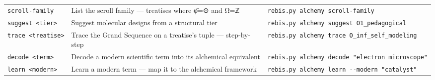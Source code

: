 \begin{longtable}[]{@{}lll@{}}
\begin{minipage}[t]{0.32\columnwidth}
\texttt{scroll-family}\strut
\end{minipage} & \begin{minipage}[t]{0.35\columnwidth}\raggedright
List the scroll family --- treatises where φ̂=⊙ and Ω=ℤ\strut
\end{minipage} & \begin{minipage}[t]{0.24\columnwidth}\raggedright
\texttt{rebis.py\ alchemy\ scroll-family}\strut
\end{minipage}\tabularnewline
\begin{minipage}[t]{0.32\columnwidth}\raggedright
\texttt{suggest\ \textless{}tier\textgreater{}}\strut
\end{minipage} & \begin{minipage}[t]{0.35\columnwidth}\raggedright
Suggest molecular designs from a structural tier\strut
\end{minipage} & \begin{minipage}[t]{0.24\columnwidth}\raggedright
\texttt{rebis.py\ alchemy\ suggest\ O1\_pedagogical}\strut
\end{minipage}\tabularnewline
\begin{minipage}[t]{0.32\columnwidth}\raggedright
\texttt{trace\ \textless{}treatise\textgreater{}}\strut
\end{minipage} & \begin{minipage}[t]{0.35\columnwidth}\raggedright
Trace the Grand Sequence on a treatise's tuple --- step-by-step\strut
\end{minipage} & \begin{minipage}[t]{0.24\columnwidth}\raggedright
\texttt{rebis.py\ alchemy\ trace\ O\_inf\_self\_modeling}\strut
\end{minipage}\tabularnewline
\begin{minipage}[t]{0.32\columnwidth}\raggedright
\texttt{decode\ \textless{}term\textgreater{}}\strut
\end{minipage} & \begin{minipage}[t]{0.35\columnwidth}\raggedright
Decode a modern scientific term into its alchemical equivalent\strut
\end{minipage} & \begin{minipage}[t]{0.24\columnwidth}\raggedright
\texttt{rebis.py\ alchemy\ decode\ "electron\ microscope"}\strut
\end{minipage}\tabularnewline
\begin{minipage}[t]{0.32\columnwidth}\raggedright
\texttt{learn\ \textless{}modern\textgreater{}}\strut
\end{minipage} & \begin{minipage}[t]{0.35\columnwidth}\raggedright
Learn a modern term --- map it to the alchemical framework\strut
\end{minipage} & \begin{minipage}[t]{0.24\columnwidth}\raggedright
\texttt{rebis.py\ alchemy\ learn\ -\/-modern\ "catalyst"}\strut
\end{minipage}\tabularnewline
\bottomrule
\end{longtable}

